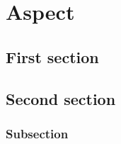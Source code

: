 \chapter{Aspect}
\lipsum[1-5]
\section{First section}
\lipsum[1-5]
\section{Second section}
\lipsum[1-5]
\subsection{Subsection}
\lipsum[1-6]

